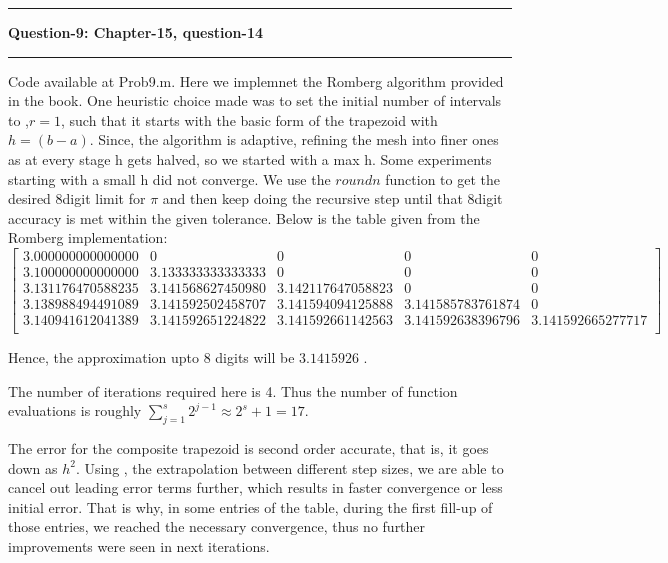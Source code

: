 \documentclass{article}
\newcommand\question[2]{\vspace{.25in}\hrule\textbf{#1: #2}\hrule\vspace{.10in}}
\begin{document}
  \question{Question-9}{Chapter-15, question-14}
  Code available at Prob9.m. \newline
  Here we implemnet the Romberg algorithm provided in the book. One heuristic choice made was to set the initial number of intervals to ,$r=1$, such that it starts with the basic form of the trapezoid with $h=(b-a)$. Since, the algorithm is adaptive, refining the mesh into finer ones as at every stage h gets halved, so we started with a max h. Some experiments starting with a small h did not converge. We use the $roundn$ function to get the desired 8digit limit for $\pi$ and then keep doing the recursive step until that 8digit accuracy is met within the given tolerance. Below is the table given from the Romberg implementation: \newline
  $\begin{bmatrix}
	  3.000000000000000 &                 0 &                 0 &                 0 &                 0 \\
	  3.100000000000000 & 3.133333333333333 &                 0 &                 0 &                 0 \\
	  3.131176470588235 & 3.141568627450980 & 3.142117647058823 &                 0 &                 0 \\
	  3.138988494491089 & 3.141592502458707 & 3.141594094125888 & 3.141585783761874 &                 0 \\
	  3.140941612041389 & 3.141592651224822 & 3.141592661142563 & 3.141592638396796 & 3.141592665277717 \\
   \end{bmatrix}$

   Hence, the approximation upto 8 digits will be $3.1415926$ . \newline

   The number of iterations required here is 4. Thus the number of function evaluations is roughly $\sum_{j=1}^s 2^{j-1} \approx 2^s + 1 = 17$. \newline

   The error for the composite trapezoid is second order accurate, that is, it goes down as $h^2$. Using , the extrapolation between different step sizes, we are able to cancel out leading error terms further, which results in faster convergence or less initial error. That is why, in some entries of the table, during the first fill-up of those entries, we reached the necessary convergence, thus no further improvements were seen in next iterations. \newline
\end{document}
